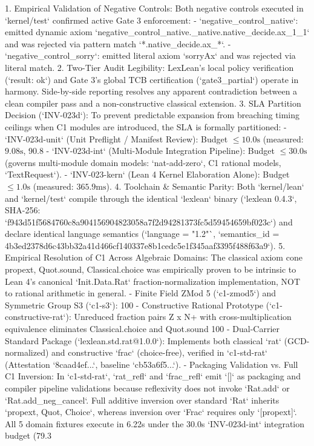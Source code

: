 1. Empirical Validation of Negative Controls: Both negative controls executed in `kernel/test` confirmed active Gate 3 enforcement:
   - `negative_control_native`: emitted dynamic axiom `negative_control_native._native.native_decide.ax_1_1` and was rejected via pattern match `*.native_decide.ax_*`.
   - `negative_control_sorry`: emitted literal axiom `sorryAx` and was rejected via literal match.
2. Two-Tier Audit Legibility: LexLean's local policy verification (`result: ok`) and Gate 3's global TCB certification (`gate3_partial`) operate in harmony. Side-by-side reporting resolves any apparent contradiction between a clean compiler pass and a non-constructive classical extension.
3. SLA Partition Decision (`INV-023d`): To prevent predictable expansion from breaching timing ceilings when C1 modules are introduced, the SLA is formally partitioned:
   - `INV-023d-unit` (Unit Preflight / Manifest Review): Budget $\le 10.0\text{s}$ (measured: $9.08\text{s}$, 90.8%
   - `INV-023d-int` (Multi-Module Integration Pipeline): Budget $\le 30.0\text{s}$ (governs multi-module domain models: `nat-add-zero`, C1 rational models, `TextRequest`).
   - `INV-023-kern` (Lean 4 Kernel Elaboration Alone): Budget $\le 1.0\text{s}$ (measured: $365.9\text{ms}$).
4. Toolchain & Semantic Parity: Both `kernel/lean` and `kernel/test` compile through the identical `lexlean` binary (`lexlean 0.4.3`, SHA-256: `f943d51f5684760c8a904156904823058a7f2d94281373fc5d59454659bf023c`) and declare identical language semantics (`language = "1.2"`, `semantics_id = 4b3ed2378d6c43bb32a41d466cf140337e8b1cedc5e1f345aaf3395f488f63a9`).
5. Empirical Resolution of C1 Across Algebraic Domains:
   The classical axiom cone {propext, Quot.sound, Classical.choice} was empirically proven to be intrinsic to Lean 4's canonical `Init.Data.Rat` fraction-normalization implementation, NOT to rational arithmetic in general.
   - Finite Field ZMod 5 (`c1-zmod5`) and Symmetric Group S3 (`c1-s3`): 100%
   - Constructive Rational Prototype (`c1-constructive-rat`): Unreduced fraction pairs Z x N+ with cross-multiplication equivalence eliminates Classical.choice and Quot.sound 100%
   - Dual-Carrier Standard Package (`lexlean.std.rat@1.0.0`): Implements both classical `rat` (GCD-normalized) and constructive `frac` (choice-free), verified in `c1-std-rat` (Attestation `8caad4ef...`, baseline `cb53a6f5...`).
   - Packaging Validation vs. Full C1 Inversion: In `c1-std-rat`, `rat_refl` and `frac_refl` emit `[]` as packaging and compiler pipeline validations because reflexivity does not invoke `Rat.add` or `Rat.add_neg_cancel`. Full additive inversion over standard `Rat` inherits `{propext, Quot, Choice}`, whereas inversion over `Frac` requires only `[propext]`. All 5 domain fixtures execute in 6.22s under the 30.0s `INV-023d-int` integration budget (79.3%

